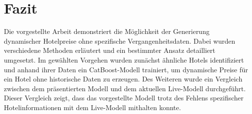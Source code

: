\chapter{Fazit}
\label{chap:fazit}

Die vorgestellte Arbeit demonstriert die Möglichkeit der Generierung dynamischer Hotelpreise ohne spezifische Vergangenheitsdaten. Dabei wurden verschiedene Methoden erläutert und ein bestimmter Ansatz detailliert umgesetzt. Im gewählten Vorgehen wurden zunächst ähnliche Hotels identifiziert und anhand ihrer Daten ein CatBoost-Modell trainiert, um dynamische Preise für ein Hotel ohne historische Daten zu erzeugen.
\newline
\newline
Des Weiteren wurde ein Vergleich zwischen dem präsentierten Modell und dem aktuellen Live-Modell durchgeführt. Dieser Vergleich zeigt, dass das vorgestellte Modell trotz des Fehlens spezifischer Hotelinformationen mit dem Live-Modell mithalten konnte.